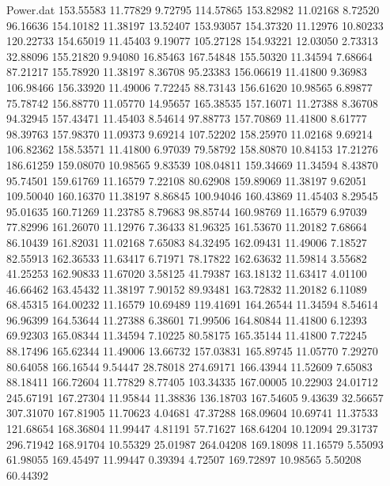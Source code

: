 \begin{filecontents}{Power.dat}
 153.55583   11.77829    9.72795  114.57865
 153.82982   11.02168    8.72520   96.16636
 154.10182   11.38197   13.52407  153.93057
 154.37320   11.12976   10.80233  120.22733
 154.65019   11.45403    9.19077  105.27128
 154.93221   12.03050    2.73313   32.88096
 155.21820    9.94080   16.85463  167.54848
 155.50320   11.34594    7.68664   87.21217
 155.78920   11.38197    8.36708   95.23383
 156.06619   11.41800    9.36983  106.98466
 156.33920   11.49006    7.72245   88.73143
 156.61620   10.98565    6.89877   75.78742
 156.88770   11.05770   14.95657  165.38535
 157.16071   11.27388    8.36708   94.32945
 157.43471   11.45403    8.54614   97.88773
 157.70869   11.41800    8.61777   98.39763
 157.98370   11.09373    9.69214  107.52202
 158.25970   11.02168    9.69214  106.82362
 158.53571   11.41800    6.97039   79.58792
 158.80870   10.84153   17.21276  186.61259
 159.08070   10.98565    9.83539  108.04811
 159.34669   11.34594    8.43870   95.74501
 159.61769   11.16579    7.22108   80.62908
 159.89069   11.38197    9.62051  109.50040
 160.16370   11.38197    8.86845  100.94046
 160.43869   11.45403    8.29545   95.01635
 160.71269   11.23785    8.79683   98.85744
 160.98769   11.16579    6.97039   77.82996
 161.26070   11.12976    7.36433   81.96325
 161.53670   11.20182    7.68664   86.10439
 161.82031   11.02168    7.65083   84.32495
 162.09431   11.49006    7.18527   82.55913
 162.36533   11.63417    6.71971   78.17822
 162.63632   11.59814    3.55682   41.25253
 162.90833   11.67020    3.58125   41.79387
 163.18132   11.63417    4.01100   46.66462
 163.45432   11.38197    7.90152   89.93481
 163.72832   11.20182    6.11089   68.45315
 164.00232   11.16579   10.69489  119.41691
 164.26544   11.34594    8.54614   96.96399
 164.53644   11.27388    6.38601   71.99506
 164.80844   11.41800    6.12393   69.92303
 165.08344   11.34594    7.10225   80.58175
 165.35144   11.41800    7.72245   88.17496
 165.62344   11.49006   13.66732  157.03831
 165.89745   11.05770    7.29270   80.64058
 166.16544    9.54447   28.78018  274.69171
 166.43944   11.52609    7.65083   88.18411
 166.72604   11.77829    8.77405  103.34335
 167.00005   10.22903   24.01712  245.67191
 167.27304   11.95844   11.38836  136.18703
 167.54605    9.43639   32.56657  307.31070
 167.81905   11.70623    4.04681   47.37288
 168.09604   10.69741   11.37533  121.68654
 168.36804   11.99447    4.81191   57.71627
 168.64204   10.12094   29.31737  296.71942
 168.91704   10.55329   25.01987  264.04208
 169.18098   11.16579    5.55093   61.98055
 169.45497   11.99447    0.39394    4.72507
 169.72897   10.98565    5.50208   60.44392

\end{filecontents}
